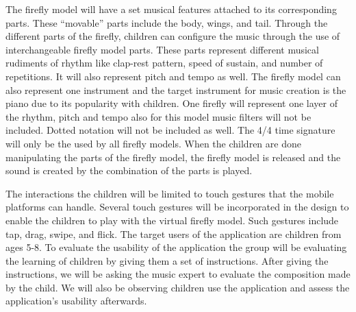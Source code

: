     The firefly model will have a set musical features attached to its corresponding parts. These “movable” parts include the body, wings, and tail. Through the different parts of the firefly, children can configure the music through the use of interchangeable firefly model parts. These parts represent different musical rudiments of rhythm like clap-rest pattern, speed of sustain, and number of repetitions. It will also represent pitch and tempo as well. The firefly model can also represent one instrument and the target instrument for music creation is the piano due to its popularity with children. One firefly will represent one layer of the rhythm, pitch and tempo also for this model music filters will not be included. Dotted notation will not be included as well. The 4/4 time signature will only be the used by all firefly models. When the children are done manipulating the parts of the firefly model, the firefly model is released and the sound is created by the combination of the parts is played.
    
    The interactions the children will be limited to touch gestures that the mobile platforms can handle. Several touch gestures will be incorporated in the design to enable the children to play with the virtual firefly model. Such gestures include tap, drag, swipe, and flick. The target users of the application are children from ages 5-8. To evaluate the usability of the application the group will be evaluating the learning of children by giving them a set of instructions. After giving the instructions, we will be asking the music expert to evaluate the composition made by the child. We will also be observing children use the application and assess the application’s usability afterwards.

\begin{comment}

%
%
Generally, one paragraph should be allotted for each of your research objectives.

Each paragraph contains a brief overview of the concept/theory and the purpose of doing the associated objective.

Each paragraph also includes a description of the scope/limitation of your study.

* Please refer to the slides for examples.

\end{comment}
    

